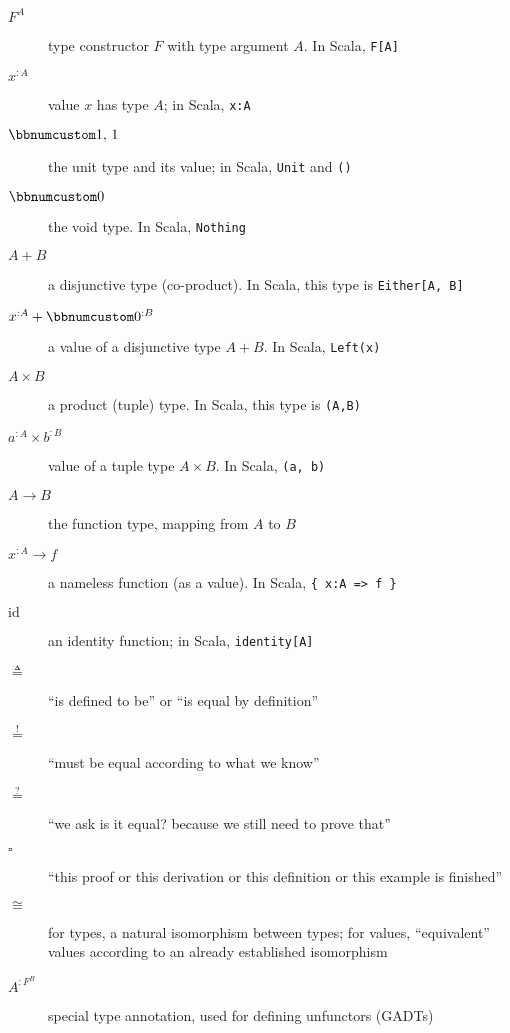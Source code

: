 \begin{description}
\item [{$F^{A}$}] \textemdash{} type constructor $F$ with type argument
$A$. In Scala, \lstinline!F[A]!
\item [{$x^{:A}$}] \textemdash{} value $x$ has type $A$; in Scala, \lstinline!x:A!
\item [{$\bbnum 1,\,1$}] \textemdash{} the unit type and its value; in
Scala, \lstinline!Unit! and \lstinline!()!
\item [{$\bbnum 0$}] \textemdash{} the void type. In Scala, \lstinline!Nothing!
\item [{$A+B$}] \textemdash{} a disjunctive type (co-product). In Scala,
this type is \lstinline!Either[A, B]! 
\item [{$x^{:A}+\bbnum 0^{:B}$}] \textemdash{} a value of a disjunctive
type $A+B$. In Scala, \lstinline!Left(x)!
\item [{$A\times B$}] \textemdash{} a product (tuple) type. In Scala,
this type is \lstinline!(A,B)!
\item [{$a^{:A}\times b^{:B}$}] value of a tuple type $A\times B$. In
Scala, \lstinline!(a, b)!
\item [{$A\rightarrow B$}] \textemdash{} the function type, mapping from
$A$ to $B$
\item [{$x^{:A}\rightarrow f$}] \textemdash{} a nameless function (as
a value). In Scala, \lstinline!{ x:A => f }!
\item [{$\text{id}$}] \textemdash{} an identity function; in Scala, \lstinline!identity[A]!
\item [{$\triangleq$}] \textemdash{} \textsf{``}is defined to be\textsf{''} or \textsf{``}is equal
by definition\textsf{''}
\item [{$\overset{!}{=}$}] \textemdash{} \textsf{``}must be equal according to
what we know\textsf{''}
\item [{$\overset{?}{=}$}] \textemdash{} \textsf{``}we ask \textemdash{} is it
equal? \textemdash{} because we still need to prove that\textsf{''}
\item [{$\square$}] \textemdash{} \textsf{``}this proof or this derivation or
this definition or this example is finished\textsf{''}
\item [{$\cong$}] \textemdash{} for types, a natural isomorphism between
types; for values, \textsf{``}equivalent\textsf{''} values according to an already
established isomorphism
\item [{$A^{:F^{B}}$}] \textemdash{} special type annotation, used for
defining unfunctors (GADTs)

\end{description}
